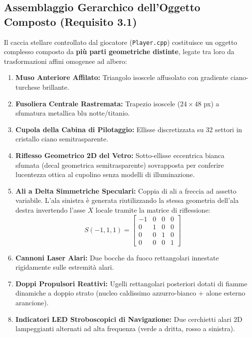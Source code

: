 \documentclass[11pt,a4paper]{article}
\begin{document}
\subsection{Assemblaggio Gerarchico dell'Oggetto Composto (Requisito 3.1)}
Il caccia stellare controllato dal giocatore (\texttt{Player.cpp}) costituisce un oggetto complesso composto da \textbf{più parti geometriche distinte}, legate tra loro da trasformazioni affini omogenee ad albero:
\begin{enumerate}
    \item \textbf{Muso Anteriore Affilato:} Triangolo isoscele affusolato con gradiente ciano-turchese brillante.
    \item \textbf{Fusoliera Centrale Rastremata:} Trapezio isoscele ($24 \times 48$ px) a sfumatura metallica blu notte/titanio.
    \item \textbf{Cupola della Cabina di Pilotaggio:} Ellisse discretizzata su 32 settori in cristallo ciano semitrasparente.
    \item \textbf{Riflesso Geometrico 2D del Vetro:} Sotto-ellisse eccentrica bianca sfumata (decal geometrica semitrasparente) sovrapposta per conferire lucentezza ottica al cupolino senza modelli di illuminazione.
    \item \textbf{Ali a Delta Simmetriche Speculari:} Coppia di ali a freccia ad assetto variabile. L'ala sinistra è generata riutilizzando la stessa geometria dell'ala destra invertendo l'asse $X$ locale tramite la matrice di riflessione:
    \begin{equation}
    S(-1, 1, 1) = \begin{bmatrix} -1 & 0 & 0 & 0 \\ 0 & 1 & 0 & 0 \\ 0 & 0 & 1 & 0 \\ 0 & 0 & 0 & 1 \end{bmatrix}
    \end{equation}
    \item \textbf{Cannoni Laser Alari:} Due bocche da fuoco rettangolari innestate rigidamente sulle estremità alari.
    \item \textbf{Doppi Propulsori Reattivi:} Ugelli rettangolari posteriori dotati di fiamme dinamiche a doppio strato (nucleo caldissimo azzurro-bianco + alone esterno arancione).
    \item \textbf{Indicatori LED Stroboscopici di Navigazione:} Due cerchietti alari 2D lampeggianti alternati ad alta frequenza (verde a dritta, rosso a sinistra).
\end{enumerate}
\end{document}
